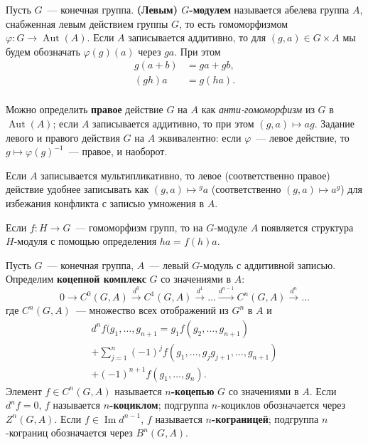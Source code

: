 \documentclass[a4paper,oneside,12pt]{article}
\theoremstyle{plain} { \swapnumbers
\newtheorem{theorem}{Теорема}[subsection]
\newtheorem{corollary}[theorem]{Следствие}
\newtheorem{lemma}[theorem]{Лемма}
\newtheorem{proposition}[theorem]{Утверждение}
\newtheorem{claim}[theorem]{Факт}
}
\theoremstyle{definition} { \swapnumbers
\newtheorem{definition}[theorem]{Определение}
\newtheorem{notation}[theorem]{Обозначение}
\newtheorem{remark}[theorem]{Замечание}
\newtheorem{remarks}[theorem]{Замечания}
\newtheorem{example}[theorem]{Пример}
\newtheorem{examples}[theorem]{Примеры}
\newtheorem{sssection}[theorem]{}
}
\def\ph{\varphi}
\def\Image{\operatorname{Im}}
\def\Aut{\operatorname{Aut}}
\begin{document}
\begin{definition}
Пусть $G$~--- конечная группа. {\bf (Левым) $G$-модулем} называется абелева группа $A$,
снабженная левым действием группы $G$, то есть гомоморфизмом $\ph\colon G\to\Aut(A)$.
Если $A$ записывается аддитивно, то для $(g,a)\in G\times A$ мы будем обозначать
$\ph(g)(a)$ через $ga$. При этом
$$
\begin{aligned}
g(a+b)&=ga+gb,\\
(gh)a&=g(ha).\\
\end{aligned}
$$
\end{definition}
\begin{remarks}
\item Можно определить {\bf правое} действие $G$ на $A$ как {\it анти-гомоморфизм}
из $G$ в $\Aut(A)$; если $A$ записывается аддитивно, то при этом $(g,a)\mapsto ag$.
Задание левого и правого действия $G$ на $A$ эквивалентно: если $\ph$~--- левое действие,
то $g\mapsto \ph(g)^{-1}$~--- правое, и наоборот.
\item Если $A$ записывается мультипликативно, то левое (соответственно правое) действие
удобнее записывать как $(g,a)\mapsto {}^ga$ (соответственно $(g,a)\mapsto a^g$) для избежания
конфликта с записью умножения в $A$.
\item Если $f\colon H\to G$~--- гомоморфизм групп, то на $G$-модуле $A$ появляется структура
$H$-модуля с помощью определения $ha=f(h)a$.
\end{remarks}
\begin{definition}
Пусть $G$~--- конечная группа, $A$~--- левый $G$-модуль с аддитивной записью.
Определим {\bf коцепной комплекс} $G$ со значениями в $A$:
$$
0\to C^0(G,A)\stackrel{d^0}{\longrightarrow}C^1(G,A)\stackrel{d^1}{\longrightarrow}\dots
\stackrel{d^{n-1}}{\longrightarrow} C^n(G,A)\stackrel{d^n}{\longrightarrow}\dots
$$
где $C^n(G,A)$~--- множество всех отображений из $G^n$ в $A$ и
\begin{multline*}
d^nf(g_1,\dots,g_{n+1}=g_1f(g_2,\dots,g_{n+1})\\
+\sum_{j=1}^n(-1)^jf(g_1,\dots,g_jg_{j+1},\dots,g_{n+1})\\
+(-1)^{n+1}f(g_1,\dots,g_n).
\end{multline*}
Элемент $f\in C^n(G,A)$ называется {\bf $n$-коцепью} $G$ со значениями в $A$. Если
$d^nf=0$, $f$ называется {\bf $n$-коциклом}; подгруппа $n$-коциклов обозначается
через $Z^n(G,A)$. Если $f\in\Image d^{n-1}$, $f$ называется {\bf $n$-кограницей};
подгруппа $n$-кограниц обозначается через $B^n(G,A)$.
\end{definition}
\end{document}
